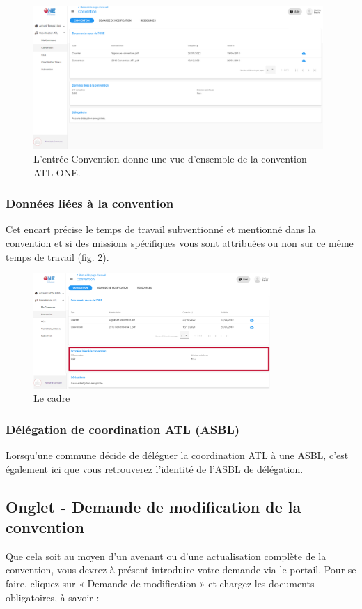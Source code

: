 \begin{figure}[htbp]
    \centering
    \includegraphics[width=11cm]{Images/catl/Convention.png}
    \caption{L'entrée Convention donne une vue d'ensemble de la convention ATL-ONE.}
    \label{fig:convention_catl}
\end{figure}


\subsubsection{Données liées à la convention}
Cet encart précise le temps de travail subventionné et mentionné dans la convention et si des missions spécifiques vous sont attribuées ou non sur ce même temps de travail (fig. \ref{fig:convention_etp_mission}). 

\begin{figure}[h!]
    \centering
    \includegraphics[width=9cm]{Images/catl/Convention-etp-missions.png}
    \caption{Le cadre }
    \label{fig:convention_etp_mission}
\end{figure}

\subsubsection{Délégation de coordination ATL (ASBL)}
Lorsqu’une commune décide de déléguer la coordination ATL à une ASBL, c’est également ici que vous retrouverez l’identité de l’ASBL de délégation. 

\subsection{Onglet - Demande de modification de la convention}
Que cela soit au moyen d’un avenant ou d’une actualisation complète de la convention, vous devrez à présent introduire votre demande via le portail. Pour se faire, cliquez sur « Demande de modification » et chargez les documents obligatoires, à savoir : 


